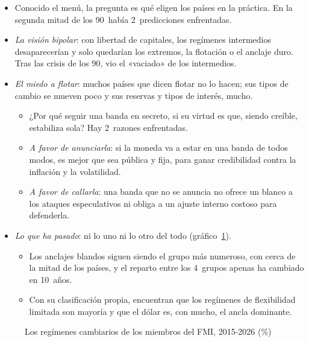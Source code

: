 \documentclass[11pt]{article}
\begin{document}
\begin{itemize}
\item Conocido el menú, la pregunta es qué eligen los países en la práctica. En la segunda mitad de los 90~había 2~predicciones enfrentadas.
\item \emph{La visión bipolar}: con libertad de capitales, los regímenes intermedios desaparecerían y solo quedarían los extremos, la flotación o el anclaje duro\nocite{Eichengreen1994International,ObstfeldRogoff1995Mirage}. Tras las crisis de los 90, \textcite{Fischer2001Bipolar} vio el «vaciado» de los intermedios.
\item \emph{El miedo a flotar}: muchos países que dicen flotar no lo hacen; sus tipos de cambio se mueven poco y sus reservas y tipos de interés, mucho\nocite{CalvoReinhart2002}.
  \begin{itemize}
  \item ¿Por qué seguir una banda en secreto, si su virtud es que, siendo creíble, estabiliza sola? Hay 2~razones enfrentadas.
  \item \emph{A favor de anunciarla}: si la moneda va a estar en una banda de todos modos, es mejor que sea pública y fija, para ganar credibilidad contra la inflación y la volatilidad.
  \item \emph{A favor de callarla}: una banda que no se anuncia no ofrece un blanco a los ataques especulativos ni obliga a un ajuste interno costoso para defenderla.
  \end{itemize}
\item \emph{Lo que ha pasado}: ni lo uno ni lo otro del todo (gráfico~\ref{fig:regimenes-evolucion}).
  \begin{itemize}
  \item Los anclajes blandos siguen siendo el grupo más numeroso, con cerca de la mitad de los países, y el reparto entre los 4~grupos apenas ha cambiado en 10~años\nocite{FMI2024AREAER2023,FMI2026InformeAnual}.
  \item Con su clasificación propia, \textcite{IlzetzkiReinhartRogoff2019} encuentran que los regímenes de flexibilidad limitada son mayoría y que el dólar es, con mucho, el ancla dominante.
  \end{itemize}
\end{itemize}

\begin{figure}[H]
\centering
\caption{Los regímenes cambiarios de los miembros del FMI, 2015-2026 (\%)}\label{fig:regimenes-evolucion}
\end{figure}
\end{document}
